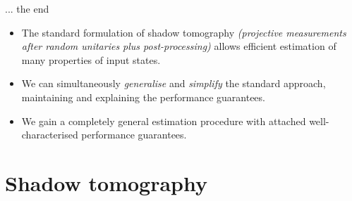 \documentclass{beamer}
\begin{document}
\begin{frame}{\hspace{9.5cm}... the end}
    \begin{itemize}
    \setlength\itemsep{1em}
        \item \colorbox{red!10}{\parbox[t]{\dimexpr\linewidth-2\fboxsep}{The standard formulation of shadow tomography \textit{(projective measurements after random unitaries plus post-processing)} allows efficient estimation of many properties of input states.}}
        \item \colorbox{green!10}{\parbox[t]{\dimexpr\linewidth-2\fboxsep}{%
            We can simultaneously \textit{generalise} and \textit{simplify} the standard approach, maintaining and explaining the performance guarantees.
        }}
        \item \colorbox{orange!10}{\parbox[t]{\dimexpr\linewidth-2\fboxsep}{%
            We gain a completely general estimation procedure with attached well-characterised performance guarantees.
        }}
    \end{itemize}
\end{frame}


\section{Shadow tomography}
\end{document}
